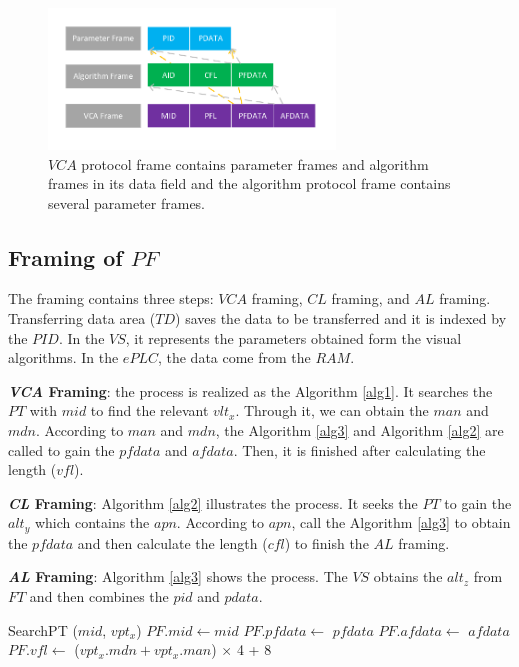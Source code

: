 \documentclass[journal,UTF8]{IEEEtran}
\begin{document}
\begin{figure}
	\centering
	\includegraphics[width=3in]{fig/Protocol.pdf}
	\caption{ $VCA$ protocol frame contains parameter frames and algorithm frames in its data field and the algorithm protocol frame contains several parameter frames.}
	\label{fig:Protocol}
\end{figure}
\subsection{Framing of $PF$}
The framing contains three steps: $VCA$ framing, $CL$ framing, and $AL$ framing. Transferring data area ($TD$) saves the data to be transferred and it is indexed by the $PID$. In the $VS$, it represents the parameters obtained form the visual algorithms. In the $ePLC$, the data come from the $RAM$.   


\textbf{\emph{VCA} Framing}: the process is realized as the Algorithm \ref{alg1}. It searches the $PT$ with $mid$ to find the relevant $vlt_x$. Through it, we can obtain the $man$ and $mdn$. According to $man$ and $mdn$, the Algorithm \ref{alg3} and Algorithm \ref{alg2} are called to gain the $pfdata$ and $afdata$. Then, it is finished after calculating the length ($vfl$).

\textbf{\emph{CL} Framing}: Algorithm \ref{alg2} illustrates the process. It seeks the $PT$ to gain the $alt_y$ which contains the $apn$. According to $apn$, call the Algorithm \ref{alg3} to obtain the $pfdata$ and then calculate the length ($cfl$) to finish the $AL$ framing.  

\textbf{\emph{AL} Framing}: Algorithm \ref{alg3} shows the process. The $VS$ obtains the $alt_z$ from $FT$ and then combines the $pid$ and $pdata$.


\begin{algorithm}
	\label{alg1}
	\caption{$VCAFraming$}%
	SearchPT ($mid$, $vpt_x$)\;
	$PF.mid\leftarrow mid$\; 
    $PF.pfdata\leftarrow$ $pfdata$\; 
    $PF.afdata\leftarrow$ $afdata$\; 
	$PF.vfl\leftarrow$ ($vpt_x.mdn+vpt_x.man$) $\times$ 4 + 8\;
\end{algorithm}
\end{document}
